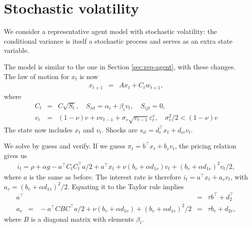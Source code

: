 \documentclass[12pt]{article}
\begin{document}
{%

\begin{comment}
{\it Kalman filter.\/}
The idea is to estimate the state $x_t$ given
(infinite) measurement histories $ y^s = (y_s, y_{s-1}, \ldots)$.
One popular notation is to express conditional expectations of
$x_t$ by
\begin{eqnarray*}
    \widehat{x}_{t|s} &=& E (x_t | y^s) .
\end{eqnarray*}
We use a more compact notation that's also common,
\begin{eqnarray*}
    \widehat{x}_{t}   &=& E (x_t | y^{t}) \\
    \widehat{x}_{t}^{-} &=& E ( x_t | y^{t-1} ) .
\end{eqnarray*}

Etc.
\end{comment}


\section{Stochastic volatility}
\label{app:stoch-vol}

We consider a representative agent model
with stochastic volatility:
the conditional variance is itself a stochastic process
and serves as an extra state variable.

The model is similar to the one in Section \ref{sec:rep-agent},
with these changes.
The law of motion for $x_t$ is now
\begin{eqnarray*}
    x_{t+1} &=&  A  x_t + C_t w_{t+1} ,
\end{eqnarray*}
where
\begin{eqnarray*}
   C_t &=& C \sqrt{S_t}, \quad S_{ii t} = \alpha_i+\beta_i v_t, \quad S_{ijt}=0, \\
       v_t &=& (1-\nu) v + \nu v_{t-1} + \sigma_v \sqrt{v_{t-1}} \varepsilon_t^v, \quad \sigma_v^2/2<(1-\nu)v
\end{eqnarray*}
The state now includes $x_t$ and $v_t$.
Shocks are $s_{it}=d_i^{\top}x_t+d_{iv}v_t.$

We solve by guess and verify.
If we guess $\pi_t=b^{\top}x_t + b_v v_t$,
the pricing relation gives us
\begin{eqnarray*}
    i_t = \rho + \alpha g - a^{\top} C_t C_t^{\top} a/2 + a^{\top} x_t + \nu (b_v+\alpha d_{1v}) v_t + (b_v+\alpha d_{1v})^2 v_t/2,
\end{eqnarray*}
where $a$ is the same as before.
The interest rate is therefore $i_t=a^{\top}x_t+a_v v_t$,
with $a_v = (b_v + \alpha d_{1v})^2/2 $.
Equating it to the Taylor rule implies
\begin{eqnarray*}
     a^{\top} &=& \tau b^{\top} +d_2^{\top} \\
     a_v \;\;=\;\; - a^{\top} C B C^{\top} a/2 + \nu (b_v+\alpha d_{1v}) + (b_v+\alpha d_{1v})^2 /2 &=& \tau b_v + d_{2v},
\end{eqnarray*}
where $ B$ is a diagonal matrix with elements $\beta_i$.

}
\end{document}
